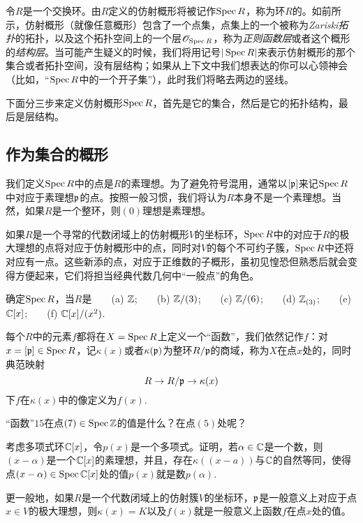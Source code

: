 令$R$是一个交换环。由$R$定义的仿射概形将被记作$\operatorname{Spec} R$，称为环$R$的。如前所示，仿射概形（就像任意概形）包含了一个点集，点集上的一个被称为\textit{Zariski拓扑}的拓扑，以及这个拓扑空间上的一个层$\mathscr{O}_{\operatorname{Spec} R}$，称为\textit{正则函数层}或者这个概形的\textit{结构层}。当可能产生疑义的时候，我们将用记号$|\operatorname{Spec} R|$来表示仿射概形的那个集合或者拓扑空间，没有层结构；如果从上下文中我们想表达的你可以心领神会（比如，“$\operatorname{Spec} R$中的一个开子集”），此时我们将略去两边的竖线。

下面分三步来定义仿射概形$\operatorname{Spec} R$，首先是它的集合，然后是它的拓扑结构，最后是层结构。

\subsection{作为集合的概形}\label{s:1.1.1}

我们定义$\operatorname{Spec} R$中的点是$R$的素理想。为了避免符号混用，通常以$[\mathfrak{p}]$来记$\operatorname{Spec} R$中对应于素理想$\mathfrak{p}$的点。按照一般习惯，我们将认为$R$本身不是一个素理想。当然，如果$R$是一个整环，则$(0)$理想是素理想。

如果$R$是一个寻常的代数闭域上的仿射概形$V$的坐标环，$\operatorname{Spec} R$中的对应于$R$的极大理想的点将对应于仿射概形中的点，同时对$V$的每个不可约子簇，$\operatorname{Spec} R$中还将对应有一点。这些新添的点，对应于正维数的子概形，虽初见惶恐但熟悉后就会变得方便起来，它们将担当经典代数几何中“一般点”的角色。

\begin{exe}
确定$\operatorname{Spec} R$，当$R$是~~~~(a) $\mathbb{Z}$;~~~~(b) $\mathbb{Z}/(3)$;~~~~(c) $\mathbb{Z}/(6)$;~~~~(d) $\mathbb{Z}_{(3)}$;~~~~(e) $\mathbb{C}[x]$;~~~~(f) $\mathbb{C}[x]/(x^2)$.
\end{exe}

每个$R$中的元素$f$都将在$X=\operatorname{Spec} R$上定义一个“函数”，我们依然记作$f$：对$x=[\mathfrak{p}]\in \operatorname{Spec} R$，记$\kappa(x)$或者$\kappa(\mathfrak{p})$为整环$R/\mathfrak{p}$的商域，称为$X$在点$x$处的，同时典范映射
\[
	R\to R/\mathfrak{p}\to \kappa(x)
\]
下$f$在$\kappa(x)$中的像定义为$f(x)$.

\begin{exe}
	“函数”$15$在点$(7)\in \operatorname{Spec} \mathbb{Z}$的值是什么？在点$(5)$处呢？
\end{exe}

\begin{exe}
	\begin{compactenum}[(a)]
		\item 考虑多项式环$\mathbb{C}[x]$，令$p(x)$是一个多项式。证明，若$\alpha\in\mathbb{C}$是一个数，则$(x-\alpha)$是一个$\mathbb{C}[x]$的素理想，并且，存在$\kappa((x-a))$与$\mathbb{C}$的自然等同，使得点$(x-\alpha)\in\operatorname{Spec}\mathbb{C}[x]$处的值$p(x)$就是数$p(\alpha)$.
		\item 更一般地，如果$R$是一个代数闭域上的仿射簇$V$的坐标环，$\mathfrak{p}$是一般意义上对应于点$x\in V$的极大理想，则$\kappa(x)=K$以及$f(x)$就是一般意义上函数$f$在点$x$处的值。
	\end{compactenum}
\end{exe}

